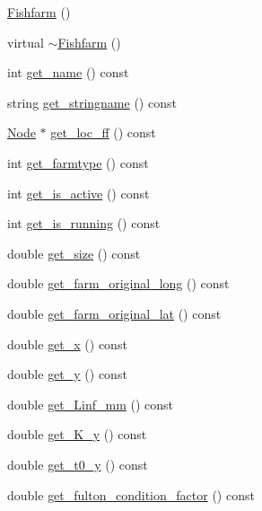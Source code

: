 \begin{DoxyCompactItemize}
\mbox{\hyperlink{class_fishfarm_a1c61719babbe711e95e179137797fc22}{Fishfarm}} ()
\item 
virtual \mbox{\hyperlink{class_fishfarm_ac6c9f75dd2c65158dcf6c2ad65758f28}{$\sim$\+Fishfarm}} ()
\item 
int \mbox{\hyperlink{class_fishfarm_a348dcb42668ee858295726b3296246d7}{get\+\_\+name}} () const
\item 
string \mbox{\hyperlink{class_fishfarm_a7292eee3273126c23009d5dec596cc68}{get\+\_\+stringname}} () const
\item 
\mbox{\hyperlink{class_node}{Node}} $\ast$ \mbox{\hyperlink{class_fishfarm_ad2e9367523994f7521a47c1333a9f61d}{get\+\_\+loc\+\_\+ff}} () const
\item 
int \mbox{\hyperlink{class_fishfarm_aedf2000fbd046927331dce5d3a95c83b}{get\+\_\+farmtype}} () const
\item 
int \mbox{\hyperlink{class_fishfarm_ad51a326fc6c04c2015a34de9f53d90be}{get\+\_\+is\+\_\+active}} () const
\item 
int \mbox{\hyperlink{class_fishfarm_abfbd7625dd947af136ced45817318a7b}{get\+\_\+is\+\_\+running}} () const
\item 
double \mbox{\hyperlink{class_fishfarm_a088aaa3fec52698b60ee9f418ffc3b38}{get\+\_\+size}} () const
\item 
double \mbox{\hyperlink{class_fishfarm_a5dd60ab3b14ebea4b052b6f568982cb1}{get\+\_\+farm\+\_\+original\+\_\+long}} () const
\item 
double \mbox{\hyperlink{class_fishfarm_a6256f5e9ed2e74c7d78a608c8f00fe53}{get\+\_\+farm\+\_\+original\+\_\+lat}} () const
\item 
double \mbox{\hyperlink{class_fishfarm_ac0223e0e7bc6a99e982db617fad1ee6c}{get\+\_\+x}} () const
\item 
double \mbox{\hyperlink{class_fishfarm_ab79f2b7498216698ef9e017118ab01b7}{get\+\_\+y}} () const
\item 
double \mbox{\hyperlink{class_fishfarm_ac38c90c5b54df288a239a6644b96b5d3}{get\+\_\+\+Linf\+\_\+mm}} () const
\item 
double \mbox{\hyperlink{class_fishfarm_a5eb4a94c070b4d4a44ced1b6ae7cbd2f}{get\+\_\+\+K\+\_\+y}} () const
\item 
double \mbox{\hyperlink{class_fishfarm_adf2964e294891fbdef94cc1fd2b1346f}{get\+\_\+t0\+\_\+y}} () const
\item 
double \mbox{\hyperlink{class_fishfarm_af1927ba5416b01ee61c764fa74398be4}{get\+\_\+fulton\+\_\+condition\+\_\+factor}} () const
\item 

\end{DoxyCompactItemize}
